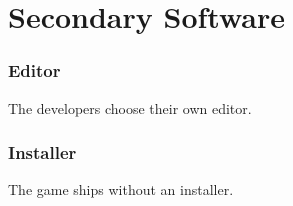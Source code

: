 \part{Secondary Software}
\section{Editor}
The developers choose their own editor.
\section{Installer}
The game ships without an installer.
